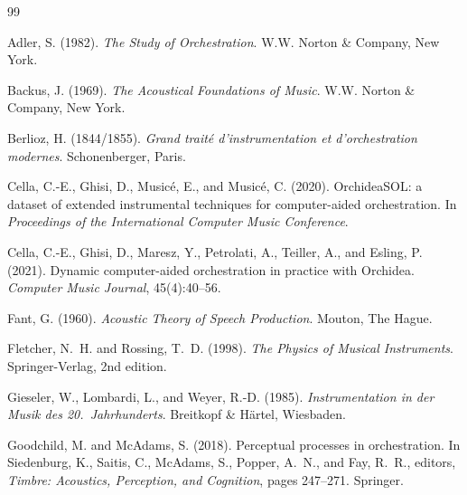 \documentclass[12pt,a4paper]{article}
\begin{document}



\begin{thebibliography}{99}

Adler, S. (1982).
\newblock \emph{The Study of Orchestration}.
\newblock W.W. Norton \& Company, New York.

Backus, J. (1969).
\newblock \emph{The Acoustical Foundations of Music}.
\newblock W.W. Norton \& Company, New York.

Berlioz, H. (1844/1855).
\newblock \emph{Grand trait\'e d'instrumentation et d'orchestration modernes}.
\newblock Schonenberger, Paris.

Cella, C.-E., Ghisi, D., Music{\'e}, E., and Music{\'e}, C. (2020).
\newblock OrchideaSOL: a dataset of extended instrumental techniques for
  computer-aided orchestration.
\newblock In \emph{Proceedings of the International Computer Music Conference}.

Cella, C.-E., Ghisi, D., Maresz, Y., Petrolati, A., Teiller, A., and
  Esling, P. (2021).
\newblock Dynamic computer-aided orchestration in practice with {O}rchidea.
\newblock \emph{Computer Music Journal}, 45(4):40--56.

Fant, G. (1960).
\newblock \emph{Acoustic Theory of Speech Production}.
\newblock Mouton, The Hague.

Fletcher, N.~H. and Rossing, T.~D. (1998).
\newblock \emph{The Physics of Musical Instruments}.
\newblock Springer-Verlag, 2nd edition.

Gieseler, W., Lombardi, L., and Weyer, R.-D. (1985).
\newblock \emph{Instrumentation in der Musik des 20.\ Jahrhunderts}.
\newblock Breitkopf \& H{\"a}rtel, Wiesbaden.

Goodchild, M. and McAdams, S. (2018).
\newblock Perceptual processes in orchestration.
\newblock In Siedenburg, K., Saitis, C., McAdams, S., Popper, A.~N., and
  Fay, R.~R., editors, \emph{Timbre: Acoustics, Perception, and Cognition},
  pages 247--271. Springer.


\end{thebibliography}
\end{document}
